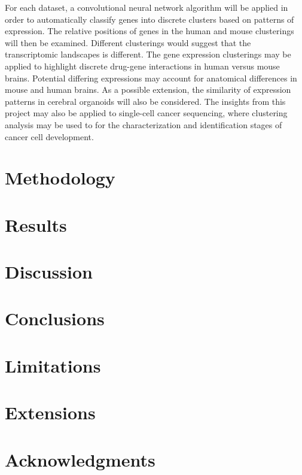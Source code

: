 \documentclass[12pt,oneside,onecolumn,a4paper]{article}
\begin{document}
For each dataset, a convolutional neural network algorithm will be applied in order to automatically classify genes into discrete clusters based on patterns of expression. The relative positions of genes in the human and mouse clusterings will then be examined. Different clusterings would suggest that the transcriptomic landscapes is different. The gene expression clusterings may be applied to highlight discrete drug-gene interactions in human versus mouse brains. Potential differing expressions may account for anatomical differences in mouse and human brains. As a possible extension, the similarity of expression patterns in cerebral organoids will also be considered. The insights from this project may also be applied to single-cell cancer sequencing, where clustering analysis may be used to for the characterization and identification stages of cancer cell development.

\section{Methodology}

\section{Results}

\section{Discussion}

\section{Conclusions}

\section{Limitations}

\section{Extensions}

\section{Acknowledgments}



\end{document}
